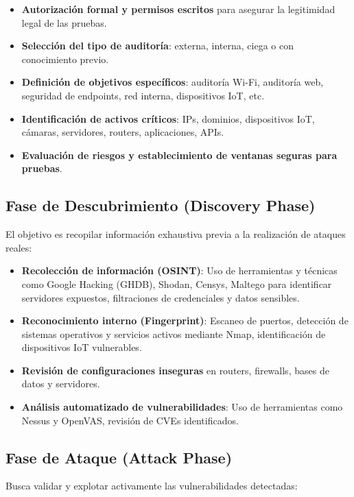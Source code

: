 \documentclass[a4paper, 10pt]{article}
\begin{document}
\begin{itemize}
\item \textbf{Autorización formal y permisos escritos} para asegurar la legitimidad legal de las pruebas.
\item \textbf{Selección del tipo de auditoría}: externa, interna, ciega o con conocimiento previo.
\item \textbf{Definición de objetivos específicos}: auditoría Wi-Fi, auditoría web, seguridad de endpoints, red interna, dispositivos IoT, etc.
\item \textbf{Identificación de activos críticos}: IPs, dominios, dispositivos IoT, cámaras, servidores, routers, aplicaciones, APIs.
\item \textbf{Evaluación de riesgos y establecimiento de ventanas seguras para pruebas}.
\end{itemize}

\subsection{Fase de Descubrimiento (Discovery Phase)}

El objetivo es recopilar información exhaustiva previa a la realización de ataques reales:

\begin{itemize}
\item \textbf{Recolección de información (OSINT)}: Uso de herramientas y técnicas como Google Hacking (GHDB), Shodan, Censys, Maltego para identificar servidores expuestos, filtraciones de credenciales y datos sensibles.
\item \textbf{Reconocimiento interno (Fingerprint)}: Escaneo de puertos, detección de sistemas operativos y servicios activos mediante Nmap, identificación de dispositivos IoT vulnerables.
\item \textbf{Revisión de configuraciones inseguras} en routers, firewalls, bases de datos y servidores.
\item \textbf{Análisis automatizado de vulnerabilidades}: Uso de herramientas como Nessus y OpenVAS, revisión de CVEs identificados.
\end{itemize}

\subsection{Fase de Ataque (Attack Phase)}

Busca validar y explotar activamente las vulnerabilidades detectadas:
\end{document}
